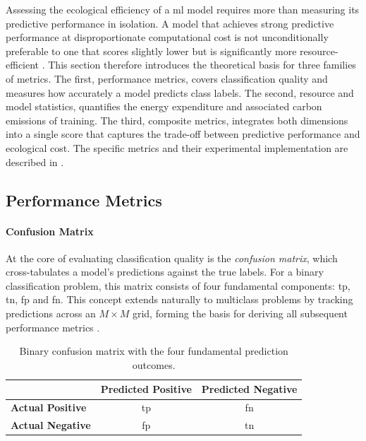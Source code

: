 Assessing the ecological efficiency of a \gls{ml} model requires more than measuring its predictive performance in isolation. A model that achieves strong predictive performance at disproportionate computational cost is not unconditionally preferable to one that scores slightly lower but is significantly more resource-efficient \parencite{schwartzGreenAI2020}. This section therefore introduces the theoretical basis for three families of metrics. The first, performance metrics, covers classification quality and measures how accurately a model predicts class labels. The second, resource and model statistics, quantifies the energy expenditure and associated carbon emissions of training. The third, composite metrics, integrates both dimensions into a single score that captures the trade-off between predictive performance and ecological cost. The specific metrics and their experimental implementation are described in .

\subsection{Performance Metrics}

\paragraph{Confusion Matrix}
At the core of evaluating classification quality is the \textit{confusion matrix}, which cross-tabulates a model's predictions against the true labels. For a binary classification problem, this matrix consists of four fundamental components: \gls{tp}, \gls{tn}, \gls{fp} and \gls{fn}. This concept extends naturally to multiclass problems by tracking predictions across an $M \times M$ grid, forming the basis for deriving all subsequent performance metrics \parencite{hastieElementsStatisticalLearning2017}.

\begin{table}[ht]
\centering
\caption{Binary confusion matrix with the four fundamental prediction outcomes.}
\label{tab:confusion_matrix}
\begin{tabular}{lcc}
\toprule
 & \textbf{Predicted Positive} & \textbf{Predicted Negative} \\
\midrule
\textbf{Actual Positive} & \gls{tp} & \gls{fn} \\
\textbf{Actual Negative} & \gls{fp} & \gls{tn} \\
\bottomrule
\end{tabular}
\end{table}

